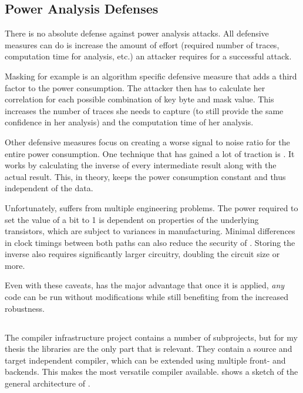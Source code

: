 \subsection{Power Analysis Defenses}
There is no absolute defense against power analysis attacks.
All defensive measures can do is increase the amount of effort (required number of traces, computation time for analysis, etc.) an attacker requires for a successful attack.

Masking for example is an algorithm specific defensive measure that adds a third factor to the power consumption.
The attacker then has to calculate her correlation for each possible combination of key byte and mask value.
This increases the number of traces she needs to capture (to still provide the same confidence in her analysis) and the computation time of her analysis.

Other defensive measures focus on creating a worse signal to noise ratio for the entire power consumption.
One technique that has gained a lot of traction is \dual{}\cite{sokolov2005design}.
It works by calculating the inverse of every intermediate result along with the actual result.
This, in theory, keeps the power consumption constant and thus independent of the data.

Unfortunately, \dual{} suffers from multiple engineering problems.
The power required to set the value of a bit to 1 is dependent on properties of the underlying transistors, which are subject to variances in manufacturing.\cite{razafindraibe2006formal}
Minimal differences in clock timings between both paths can also reduce the security of \dual{}\cite{baddam2008path}.
Storing the inverse also requires significantly larger circuitry, doubling the circuit size or more\cite{baddam2008path}.

Even with these caveats, \dual{} has the major advantage that once it is applied, \emph{any} code can be run without modifications while still benefiting from the increased robustness.

\subsection{\llvm{}}
\label{llvm}
The \llvm{} compiler infrastructure project\cite{lattner2010llvm} contains a number of subprojects, but for my thesis the \lc{} libraries are the only part that is relevant.
They contain a source and target independent compiler, which can be extended using multiple front- and backends.
This makes \llvm{} the most versatile compiler available.
 shows a sketch of the general architecture of \llvm{}.

